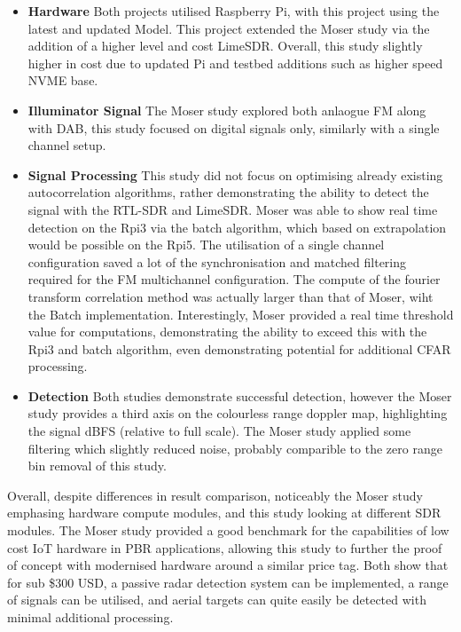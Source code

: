 \begin{itemize}
    \item \textbf{Hardware} Both projects utilised Raspberry Pi, with this project using the latest and updated Model. This project extended the Moser study via the addition of a higher level and cost LimeSDR. Overall, this study slightly higher in cost due to updated Pi and testbed additions such as higher speed NVME base. 
    \item \textbf{Illuminator Signal} The Moser study explored both anlaogue FM along with DAB, this study focused on digital signals only, similarly with a single channel setup. 
    \item \textbf{Signal Processing} This study did not focus on optimising already existing autocorrelation algorithms, rather demonstrating the ability to detect the signal with the RTL-SDR and LimeSDR. Moser was able to show real time detection on the Rpi3 via the batch algorithm, which based on extrapolation would be possible on the Rpi5. The utilisation of a single channel configuration saved a lot of the synchronisation and matched filtering required for the FM multichannel configuration. The compute of the fourier transform correlation method was actually larger than that of Moser, wiht the Batch implementation. Interestingly, Moser provided a real time threshold value for computations, demonstrating the ability to exceed this with the Rpi3 and batch algorithm, even demonstrating potential for additional CFAR processing.
    \item \textbf{Detection} Both studies demonstrate successful detection, however the Moser study provides a third axis on the colourless range doppler map, highlighting the signal dBFS (relative to full scale). The Moser study applied some filtering which slightly reduced noise, probably comparible to the zero range bin removal of this study. 
\end{itemize}

Overall, despite differences in result comparison, noticeably the Moser study emphasing hardware compute modules, and this study looking at different SDR modules. The Moser study provided a good benchmark for the capabilities of low cost IoT hardware in PBR applications, allowing this study to further the proof of concept with modernised hardware around a similar price tag. Both show that for sub \$300 USD, a passive radar detection system can be implemented, a range of signals can be utilised, and aerial targets can quite easily be detected with minimal additional processing.

